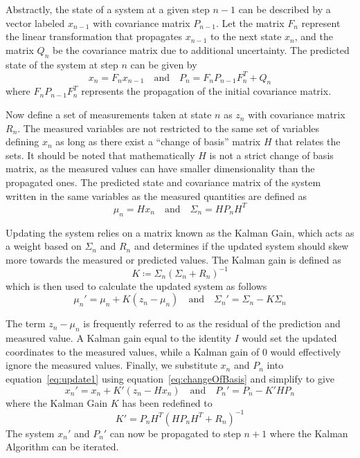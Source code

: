 Abstractly, the state of a system at a given step $n-1$ can be described by a vector labeled $x_{n-1}$ with covariance matrix $P_{n-1}$. Let the matrix $F_n$ represent the linear transformation that propagates $x_{n-1}$ to the next state $x_{n}$, and the matrix $Q_{n}$ be the covariance matrix due to additional uncertainty. The predicted state of the system at step $n$ can be given by
\begin{equation}
	\label{eq:prop}
	x_{n}=F_{n}x_{n-1} \quad \textrm{and} \quad P_{n}=F_nP_{n-1}F_n^T+Q_n
\end{equation}
where $F_nP_{n-1}F_n^T$ represents the propagation of the initial covariance matrix.

Now define a set of measurements taken at state $n$ as $z_n$ with covariance matrix $R_n$. The measured variables are not restricted to the same set of variables defining $x_n$ as long as there exist a ``change of basis'' matrix $H$ that relates the sets. It should be noted that mathematically $H$ is not a strict change of basis matrix, as the measured values can have smaller dimensionality than the propagated ones. The predicted state and covariance matrix of the system written in the same variables as the measured quantities are defined as
\begin{equation}
	\label{eq:changeOfBasis}
	\mu_n=Hx_n \quad \textrm{and} \quad \Sigma_n=HP_nH^{T}
\end{equation}

Updating the system relies on a matrix known as the Kalman Gain, which acts as a weight based on $\Sigma_n$ and $R_n$ and determines if the updated system should skew more towards the measured or predicted values. The Kalman gain is defined as
\begin{equation}
	\label{eq:gain}
	K\coloneqq \Sigma_n\left(\Sigma_n+R_n\right)^{-1}
\end{equation}
which is then used to calculate the updated system as follows
\begin{equation}
	\label{eq:update1}
	\mu_n'=\mu_n+K\left(z_n-\mu_n\right) \quad \textrm{and} \quad \Sigma_n'=\Sigma_n-K\Sigma_n
\end{equation}

The term $z_n-\mu_n$ is frequently referred to as the residual of the prediction and measured value. A Kalman gain equal to the identity $I$ would set the updated coordinates to the measured values, while a Kalman gain of $0$ would effectively ignore the measured values. Finally, we substitute $x_n$ and $P_n$ into equation~\ref{eq:update1} using equation~\ref{eq:changeOfBasis} and simplify to give
\begin{equation}
	x_n'=x_n+K'(z_n-Hx_n) \quad \mathrm{and} \quad P_n'= P_n-K'HP_n
\end{equation}
where the Kalman Gain $K$ has been redefined to
\begin{equation} \label{eq:gain2}
	K'=P_nH^T(HP_nH^T+R_n)^{-1}
\end{equation}
The system $x_n'$ and $P_n'$ can now be propagated to step $n+1$ where the Kalman Algorithm can be iterated.

